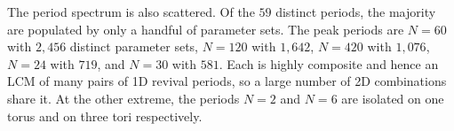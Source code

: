 The period spectrum is also scattered. Of the $59$ distinct
periods, the majority are populated by only a handful of
parameter sets. The peak periods are $N = 60$ with $2{,}456$
distinct parameter sets, $N = 120$ with $1{,}642$, $N = 420$ with
$1{,}076$, $N = 24$ with $719$, and $N = 30$ with $581$. Each is
highly composite and hence an LCM of many pairs of 1D revival
periods, so a large number of 2D combinations share it. At the
other extreme, the periods $N = 2$ and $N = 6$ are isolated on
one torus and on three tori respectively.
